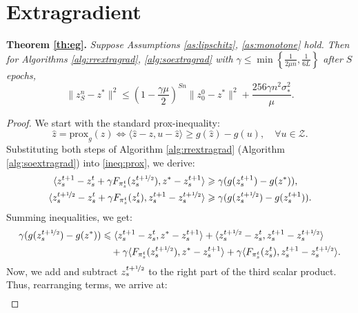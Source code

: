 \documentclass{article}
\begin{document}
\section{Extragradient}\label{E}
\textbf{Theorem \ref{th:eg}.}
\textit{Suppose Assumptions \ref{as:lipschitz}, \ref{as:monotone} hold. Then for Algorithms \ref{alg:rrextragrad}, \ref{alg:soextragrad} with $\gamma\leqslant \min \left\{\frac{1}{2\mu n}, \frac{1}{6L} \right\}$ after $S$ epochs,}
    \begin{equation*}
        \|z_S^n - z^*\|^2 \leqslant (1 - \frac{\gamma\mu}{2})^{Sn} \|z^0_0 - z^*\|^2 +  \frac{256\gamma n^2\sigma^2_*}{\mu}.
    \end{equation*}

    \begin{proof}

         We start with the standard prox-inequality:
        \begin{equation}\label{ineq:prox}
            \hat{z} = \text{prox}_{g}(z) \Longleftrightarrow \langle \hat{z} - z, u - \hat{z}\rangle \geqslant g(\hat{z}) - g(u), \quad\forall u\in \mathcal{Z}.
        \end{equation}
        Substituting both steps of Algorithm \ref{alg:rrextragrad} (Algorithm \ref{alg:soextragrad}) into \eqref{ineq:prox}, we derive:
        \begin{align*}
            \langle z_s^{t+1} - z_s^t + \gamma F_{\pi_s^t}(z_s^{t+\nicefrac{1}{2}}), z^* - z_s^{t+1}\rangle &\geqslant \gamma(g(z_s^{t+1}) - g(z^*)),\\
            \langle z_s^{t+\nicefrac{1}{2}} - z_s^t + \gamma F_{\pi_s^t}(z_s^t), z_s^{t+1} - z_s^{t+\nicefrac{1}{2}}\rangle &\geqslant \gamma(g(z_s^{t+\nicefrac{1}{2}}) - g(z_s^{t+1})).
        \end{align*}
        Summing inequalities, we get:
        \begin{align*}
        \gamma(g(z_s^{t+\nicefrac{1}{2}}) - g(z^*)) & \leqslant 
            \langle z_s^{t+1} - z_s^t, z^* - z_s^{t+1}\rangle+ \langle z_s^{t+\nicefrac{1}{2}} - z_s^t, z_s^{t+1} - z_s^{t+\nicefrac{1}{2}}\rangle  \\
            &\quad +\gamma\langle F_{\pi_s^t}(z_s^{t+\nicefrac{1}{2}}), z^* - z_s^{t+1}\rangle + \gamma\langle F_{\pi_s^t}(z_s^t), z_s^{t+1} - z_s^{t+\nicefrac{1}{2}}\rangle .
        \end{align*}
        Now, we add and subtract $z_s^{t+\nicefrac{1}{2}}$ to the right part of the third scalar product. Thus, rearranging terms, we arrive at:
        \begin{align}

\end{align}
\end{proof}
\end{document}

